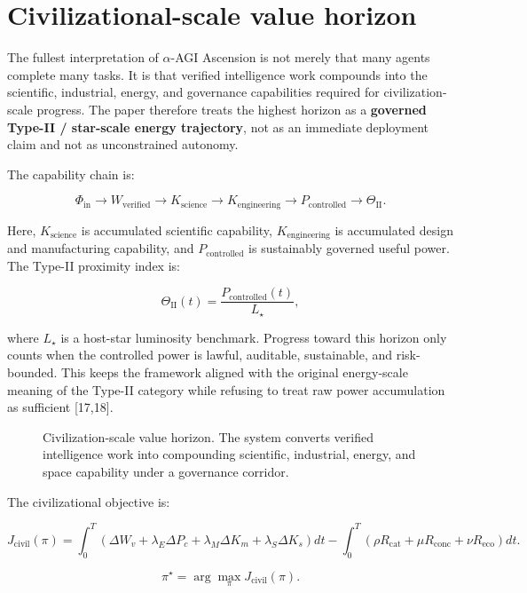 \documentclass[
  11pt,
]{article}
\begin{document}
\section{Civilizational-scale value horizon}\label{civilizational-scale-value-horizon}

The fullest interpretation of $\alpha$-AGI Ascension is not merely that
many agents complete many tasks. It is that verified intelligence work
compounds into the scientific, industrial, energy, and governance
capabilities required for civilization-scale progress. The paper
therefore treats the highest horizon as a \textbf{governed Type-II /
star-scale energy trajectory}, not as an immediate deployment claim and
not as unconstrained autonomy.

The capability chain is:

\[
\Phi_{\text{in}}
\rightarrow
W_{\text{verified}}
\rightarrow
K_{\text{science}}
\rightarrow
K_{\text{engineering}}
\rightarrow
P_{\text{controlled}}
\rightarrow
\Theta_{\mathrm{II}}.
\]

Here, $K_{\text{science}}$ is accumulated scientific capability,
$K_{\text{engineering}}$ is accumulated design and manufacturing
capability, and $P_{\text{controlled}}$ is sustainably governed useful
power. The Type-II proximity index is:

\[
\Theta_{\mathrm{II}}(t)=\frac{P_{\text{controlled}}(t)}{L_{\star}},
\]

where $L_{\star}$ is a host-star luminosity benchmark. Progress toward
this horizon only counts when the controlled power is lawful, auditable,
sustainable, and risk-bounded. This keeps the framework aligned with the
original energy-scale meaning of the Type-II category while refusing to
treat raw power accumulation as sufficient [17,18].

\begin{figure}[htbp]
\centering

\caption{Civilization-scale value horizon. The system converts verified intelligence work into compounding scientific, industrial, energy, and space capability under a governance corridor.}
\end{figure}

The civilizational objective is:

\[
J_{\mathrm{civil}}(\pi)=
\int_0^T
\left(\Delta W_v+\lambda_E\Delta P_c+\lambda_M\Delta K_m+\lambda_S\Delta K_s\right)dt
-
\int_0^T
\left(\rho R_{\mathrm{cat}}+\mu R_{\mathrm{conc}}+\nu R_{\mathrm{eco}}\right)dt .
\]

\[
\pi^{\star}=\arg\max_{\pi}J_{\mathrm{civil}}(\pi).
\]
\end{document}
